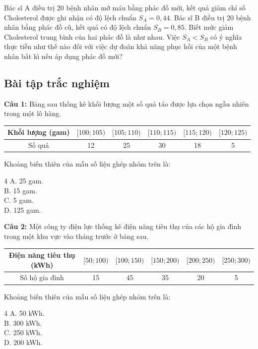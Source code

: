 \documentclass[12pt]{article}
\begin{document}
	\begin{btdo}[title={Bài 6}]
		Bác sĩ A điều trị 20 bệnh nhân mỡ máu bằng phác đồ mới, kết quả giảm chỉ số Cholesterol được ghi nhận có độ lệch chuẩn $S_A = 0,44$. Bác sĩ B điều trị 20 bệnh nhân bằng phác đồ cũ, kết quả có độ lệch chuẩn $S_B = 0,85$. 
		Biết mức giảm Cholesterol trung bình của hai phác đồ là như nhau. Việc $S_A < S_B$ có ý nghĩa thực tiễn như thế nào đối với việc dự đoán khả năng phục hồi của một bệnh nhân bất kì nếu áp dụng phác đồ mới?
	\end{btdo}
	
	
	\vspace{5mm}
	\subsection{Bài tập trắc nghiệm}
	\textbf{Câu 1:} Bảng sau thống kê khối lượng một số quả táo được lựa chọn ngẫu nhiên trong một lô hàng.
	\begin{center}
		\renewcommand{\arraystretch}{1.3}
		\begin{tabular}{|c|c|c|c|c|c|}
			\hline
			Khối lượng (gam) & $[100; 105)$ & $[105; 110)$ & $[110; 115)$ & $[115; 120)$ & $[120; 125)$ \\
			\hline
			Số quả & 12 & 25 & 30 & 18 & 5 \\
			\hline
		\end{tabular}
	\end{center}
	Khoảng biến thiên của mẫu số liệu ghép nhóm trên là:
	\begin{multicols}{4}
		A. 25 gam. \\
		B. 15 gam. \\
		C. 5 gam. \\
		D. 125 gam.
	\end{multicols}
	
	\noindent \textbf{Câu 2:} Một công ty điện lực thống kê điện năng tiêu thụ của các hộ gia đình trong một khu vực vào tháng trước ở bảng sau.
	\begin{center}
		\renewcommand{\arraystretch}{1.3}
		\begin{tabular}{|c|c|c|c|c|c|}
			\hline
			Điện năng tiêu thụ (kWh) & $[50; 100)$ & $[100; 150)$ & $[150; 200)$ & $[200; 250)$ & $[250; 300)$ \\
			\hline
			Số hộ gia đình & 15 & 45 & 35 & 20 & 5 \\
			\hline
		\end{tabular}
	\end{center}
	Khoảng biến thiên của mẫu số liệu ghép nhóm trên là:
	\begin{multicols}{4}
		A. 50 kWh. \\
		B. 300 kWh. \\
		C. 250 kWh. \\
		D. 200 kWh.
	\end{multicols}
	
\end{document}

